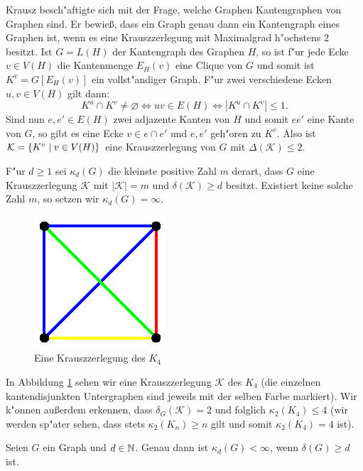 Krausz \cite{Krausz43} besch"aftigte sich mit der Frage, welche Graphen Kantengraphen von Graphen sind. Er bewie{\ss}, dass ein Graph genau dann ein Kantengraph eines Graphen ist, wenn es eine Krauszzerlegung mit Maximalgrad h"ochstens $2$ besitzt. Ist $G=L(H)$ der Kantengraph des Graphen $H$, so ist f"ur jede Ecke $v\in V(H)$ die Kantenmenge $E_H(v)$ eine Clique von $G$ und somit ist $K^{v}=G[E_H(v)]$ ein vollst"andiger Graph. F"ur zwei verschiedene Ecken $u,v\in V(H)$ gilt dann:
$$K^{u}\cap K^{v} \neq \varnothing \Leftrightarrow uv \in E(H) \Leftrightarrow |K^{u} \cap K^{v}| \leq 1.$$
Sind nun $e,e'\in E(H)$ zwei adjazente Kanten von $H$ und somit $ee'$ eine Kante von $G$, so gibt es eine Ecke $v\in e\cap e'$ und $e,e'$ geh"oren zu $K^{v}$. Also ist $\mathcal{K} = \{K^{v} \;|\; v\in V(H) \}$ eine Krauszzerlegung von $G$ mit $\Delta(\mathcal{K}) \leq 2$.

F"ur $d \geq 1$ sei $\kappa_d(G)$ die kleinste positive Zahl $m$ derart, dass $G$ eine Krauszzerlegung $\mathcal K$ mit $|\mathcal K| = m$ und $\delta(\mathcal K) \geq d$ besitzt. Existiert keine solche Zahl $m$, so setzen wir $\kappa_{d}(G) = \infty$.

\begin{figure}[htb]
  \centering
  \includegraphics{images/krauszzerlegungk4.eps}
  \caption{Eine Krauszzerlegung des $K_4$}
  \label{fig:KrauszzerlegungK4}
\end{figure}
In Abbildung \ref{fig:KrauszzerlegungK4} sehen wir eine Krauszzerlegung $\mathcal{K}$ des $K_4$ (die einzelnen kantendisjunkten Untergraphen sind jeweils mit der selben Farbe markiert). Wir k"onnen au{\ss}erdem erkennen, dass $\delta_{G}(\mathcal{K}) = 2$ und folglich $\kappa_{2}(K_4) \leq 4$ (wir werden sp"ater sehen, dass stets $\kappa_{2}(K_n) \geq n$ gilt und somit $\kappa_{2}(K_{4}) = 4$ ist). 
\begin{lemma}
  Seien $G$ ein Graph und $d\in {\mathbb{N}}$. Genau dann ist $\kappa_{d}(G) < \infty$, wenn $\delta(G) \geq d$ ist. 
  \label{lm:krauszexistenz}
\end{lemma}

